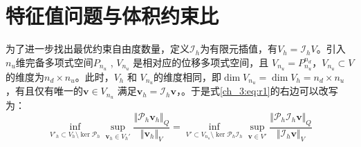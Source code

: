 \section{特征值问题与体积约束比}

为了进一步找出最优约束自由度数量，定义$\mathcal I_h$为有限元插值，有$V_h=\mathcal I_h V$。引入$n_u$维完备多项式空间$P_{n_u}$ , $V_{n_u}$ 是相对应的位移多项式空间，且 $V_{n_u} = P_{n_u}^{n_d}$，$V_{n_u} \subset V$的维度为$n_d\times n_u$。此时，$V_h$ 和 $V_{n_u}$的维度相同，即$\dim V_{n_u}=\dim V_h = n_d\times n_u$，有且仅有唯一的$\boldsymbol v \in V_{n_u}$ 满足$\boldsymbol v_h = \mathcal I_h \boldsymbol v$，。于是式\eqref{ch_3:eq:r1}的右边可以改写为：
\begin{equation}\label{ch_3:eq:r21}
    \inf_{V'_h \subset V_h\setminus \ker \mathcal P_h}\sup_{\boldsymbol v_h \in V_h'} \frac{\Vert \mathcal P_h \boldsymbol v_h \Vert_Q}{\Vert \boldsymbol v_h \Vert_V} = 
    \inf_{V'\subset V_{n_u}\setminus \ker \mathcal P_h \mathcal I_h}\sup_{\boldsymbol v \in V'} \frac{\Vert \mathcal P_h \mathcal I_h \boldsymbol v \Vert_Q}{\Vert \mathcal I_h \boldsymbol v \Vert_V}
\end{equation}

